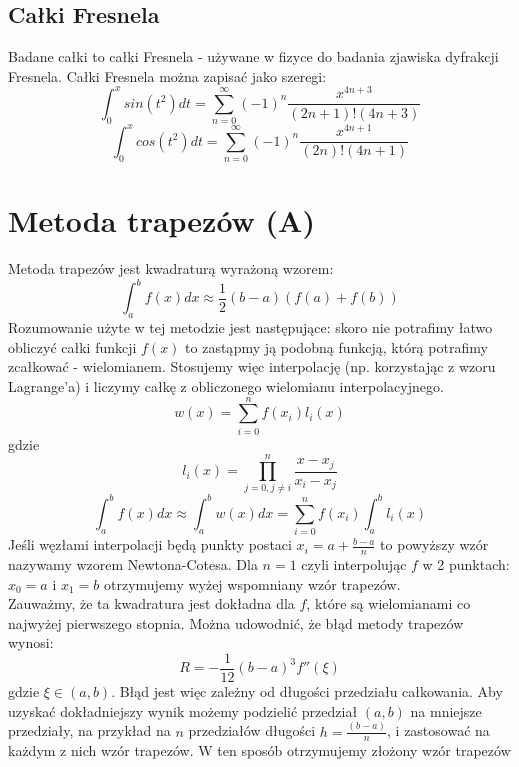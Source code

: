 \documentclass{article}
\begin{document}
\subsection*{Całki Fresnela}
Badane całki to całki Fresnela - używane w fizyce do badania zjawiska dyfrakcji 
Fresnela. Całki Fresnela można zapisać jako szeregi:
\begin{equation}
\int_0^x sin(t^2) dt = \sum_{n=0}^{\infty} (-1)^n \frac{x^{4n+3}}{(2n+1)!(4n+3)}
\end{equation}
\begin{equation}
\int_0^x cos(t^2) dt = \sum_{n=0}^{\infty} (-1)^n \frac{x^{4n+1}}{(2n)!(4n+1)}
\end{equation}
\section*{Metoda trapezów (A)}
Metoda trapezów jest kwadraturą wyrażoną wzorem: 
\begin{equation}
\int_a^b f(x) dx \approx \frac{1}{2}(b-a) (f(a)+f(b))
\end{equation}
Rozumowanie użyte w tej metodzie jest następujące: skoro nie potrafimy łatwo obliczyć całki funkcji $f(x)$ to zastąpmy ją podobną funkcją, którą potrafimy zcałkować - wielomianem. Stosujemy więc interpolację (np. korzystając z wzoru Lagrange'a) i liczymy całkę z obliczonego wielomianu interpolacyjnego. 
\begin{equation}
w(x) = \sum_{i=0}^n f(x_i)l_i(x)
\end{equation}
gdzie 
\begin{equation}
 l_i(x) = \prod ^n_{j=0, j\neq i} \frac{x-x_j}{x_i-x_j} 
\end{equation}
\begin{equation}
\int_a^b f(x) dx \approx \int_a^b w(x) dx =  \sum_{i=0}^n f(x_i)\int_a^bl_i(x)
\end{equation}
Jeśli węzłami interpolacji będą punkty postaci $x_i = a+ \frac{b-a}{n} $ to powyższy wzór nazywamy wzorem Newtona-Cotesa. Dla $n=1$ czyli interpolując $f$ w 2 punktach: $x_0=a$ i $x_1=b$ otrzymujemy wyżej wspomniany wzór trapezów.\\
Zauważmy, że ta kwadratura jest dokładna dla $f$, które są wielomianami co najwyżej pierwszego stopnia. Można udowodnić, że błąd metody trapezów wynosi:
\begin{equation}
R = -\frac{1}{12}(b-a)^3f''(\xi)
\end{equation}
gdzie $\xi \in (a, b)$.
Błąd jest więc zależny od długości przedziału całkowania. Aby uzyskać dokładniejszy wynik możemy podzielić przedział $(a, b)$ na mniejsze przedziały, na przykład na $n$ przedziałów długości $h=\frac{(b-a)}{n}$, i zastosować na każdym z nich wzór trapezów. W ten sposób otrzymujemy złożony wzór trapezów
\end{document}
